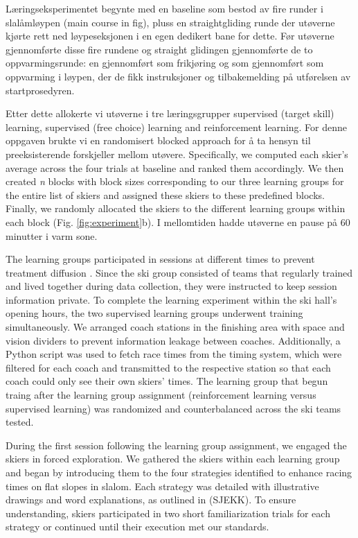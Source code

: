 Læringseksperimentet begynte med en baseline som bestod av fire runder i slalåmløypen (main course in fig), pluss en straightgliding runde der utøverne kjørte rett ned løypeseksjonen i en egen dedikert bane for dette. Før utøverne gjennomførte disse fire rundene og straight glidingen gjennomførte de to oppvarmingsrunde: en gjennomført som frikjøring og som gjennomført som oppvarming i løypen, der de fikk instruksjoner og tilbakemelding på utførelsen av startprosedyren. 

Etter dette allokerte vi utøverne i tre læringsgrupper supervised (target skill) learning, supervised (free choice) learning and reinforcement learning. For denne oppgaven brukte vi en randomisert blocked approach for å ta hensyn til preeksisterende forskjeller mellom utøvere. Specifically, we computed each skier’s average across the four trials at baseline and ranked them accordingly. We then created \textit{n} blocks with block sizes corresponding to our three learning groups for the entire list of skiers and assigned these skiers to these predefined blocks. Finally, we randomly allocated the skiers to the different learning groups within each block (Fig. \ref{fig:experiment}b). I mellomtiden hadde utøverne en pause på 60 minutter i varm sone. 

The learning groups participated in sessions at different times to prevent treatment
diffusion \cite{maxwell_designing_2017}. Since the ski group consisted of teams that regularly trained and lived together during data collection, they were instructed to keep session information private. To complete the learning experiment within the ski hall's opening hours, the two supervised learning groups underwent training simultaneously. We arranged coach stations in the finishing area with space and vision dividers to prevent information leakage between coaches. Additionally, a Python script was used to fetch race times from the timing system, which were filtered for each coach and transmitted to the respective station so that each coach could only see their own skiers' times. The learning group that begun traing after the learning group assignment (reinforcement learning versus supervised learning) was randomized and counterbalanced across the ski teams tested. 

During the first session following the learning group assignment, we engaged the skiers in forced exploration. We gathered the skiers within each learning group and began by introducing them to the four strategies identified to enhance racing times on flat slopes in slalom. Each strategy was detailed with illustrative drawings and word explanations, as outlined in (SJEKK). To ensure understanding, skiers participated in two short familiarization trials for each strategy or continued until their execution met our standards.

